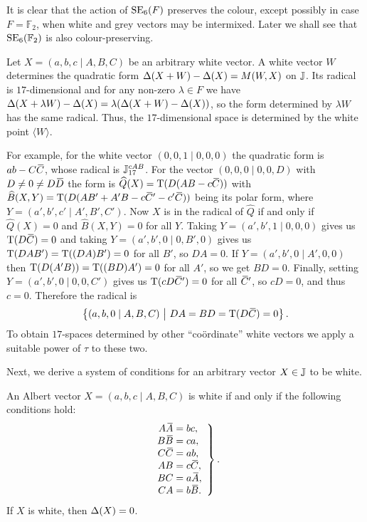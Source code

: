 It is clear that the action of $\mathrm{SE}_6(F)$ preserves the colour, except possibly in case
$F = \mathbb{F}_2$, when white and grey vectors may be intermixed. 
Later we shall see that $\mathrm{SE}_6(\mathbb{F}_2)$ is also colour-preserving.

Let $X = (a,b,c\mid A,B,C)$ be an arbitrary white vector. 
A white vector $W$ determines the quadratic form $\Delta(X+W) - \Delta(X) = M(W,X)$ on $\mathbb{J}$. 
Its radical is $17$-dimensional and for any non-zero $\lambda \in F$ 
we have $\Delta(X+\lambda W) - \Delta(X) = \lambda( \Delta(X+W) - \Delta(X) )$, so 
the form determined by $\lambda W$ has the same radical. Thus, the $17$-dimensional
space is determined by the white point $\langle W \rangle$. 

For example, for the white vector $(0,0,1\mid 0,0,0)$ the quadratic form is 
$ab - C\mathord{\mbox{\hspace*{0pt}}\,\overline{\!C\!\!\;}\!\:}\mbox{\hspace*{0pt}}$, whose radical is $\mathbb{J}_{17}^{cAB}$. For the vector
$(0,0,0\mid 0,0,D)$ with $D \neq 0 \neq D\mathord{\mbox{\hspace*{0pt}}\,\overline{\!D\!\!\;}\!\:}\mbox{\hspace*{0pt}}$ the form is 
$\widehat{Q}(X) = \operatorname{T}( D (AB - c\mathord{\mbox{\hspace*{0pt}}\,\overline{\!C\!\!\;}\!\:}\mbox{\hspace*{0pt}}) )$ with
\mbox{$\hat{B}(X,Y) = \Tr( D ( AB' + A'B - c\ovC' - c'\ovC) )$} being its polar form,
where
$Y = (a',b',c'\mid A',B',C')$. Now $X$ is in the radical of $\hat{Q}$ if 
and only if $\hat{Q}(X) = 0$ and $\hat{B}(X,Y) = 0$ for all $Y$. 
Taking \mbox{$Y = (a',b',1\mid 0,0,0)$} gives us $\operatorname{T}(D\mathord{\mbox{\hspace*{0pt}}\,\overline{\!C\!\!\;}\!\:}\mbox{\hspace*{0pt}}) = 0$ and taking 
$Y = (a',b',0\mid 0,B',0)$ gives us \mbox{$\operatorname{T}(DAB' ) = \operatorname{T}((DA)B' ) = 0$}
for all $B'$, so $DA = 0$. If $Y = (a',b',0\mid A',0,0)$ then \mbox{$\operatorname{T}(D(A'B)) = \operatorname{T}((BD)A') = 0$} for all $A'$, so we get $BD = 0$. Finally, setting
$Y = (a',b',0\mid 0,0,C')$ gives us $\operatorname{T}(cD\mathord{\mbox{\hspace*{0pt}}\,\overline{\!C\!\!\;}\!\:}\mbox{\hspace*{0pt}}') = 0$ for all $\mathord{\mbox{\hspace*{0pt}}\,\overline{\!C\!\!\;}\!\:}\mbox{\hspace*{0pt}}'$, so
$cD = 0$, and thus $c = 0$. Therefore the radical is
\begin{equation}
	\label{eq:17_space}
	\left\{ (a,b,0 \mid A,B,C)\ \big|\ DA = BD = \operatorname{T}(D\mathord{\mbox{\hspace*{0pt}}\,\overline{\!C\!\!\;}\!\:}\mbox{\hspace*{0pt}}) = 0 \right\}.
\end{equation}
To obtain $17$-spaces determined by other ``co\"{o}rdinate'' white vectors we apply 
a suitable power of $\tau$ to these two. 

Next, we derive 
a system of conditions for an arbitrary vector $X \in \mathbb{J}$ to be white. 

\begin{lemma}
	An Albert vector $X = (a,b,c\mid A,B,C)$ is white if and only if the following 
	conditions hold:
	\begin{equation}
		\left.\begin{array}{r@{\;}c@{\;}l}
			A \ovA & = & bc, \\
			B \ovB & = & ca, \\
			C \ovC & = & ab, \\
			AB & = & c\ovC, \\
			BC & = & a\ovA, \\
			CA & = & b\ovB.
		\end{array}
		\right\}.
	\end{equation}
	If $X$ is white, then $\Delta(X) = 0$. 
\end{lemma}

